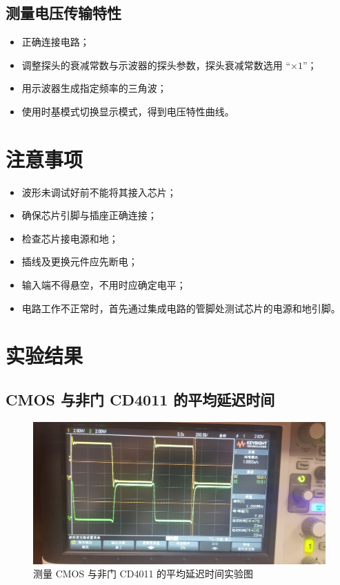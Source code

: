 \documentclass[a4paper]{article}
\begin{document}
    \subsection{测量电压传输特性}

        \begin{itemize}
            \item 正确连接电路；
            \item 调整探头的衰减常数与示波器的探头参数，探头衰减常数选用 “$\times 1$”；
            \item 用示波器生成指定频率的三角波；
            \item 使用时基模式切换显示模式，得到电压特性曲线。
        \end{itemize}

\section{注意事项}

    \begin{itemize}
        \item 波形未调试好前不能将其接入芯片；
        \item 确保芯片引脚与插座正确连接；
        \item 检查芯片接电源和地；
        \item 插线及更换元件应先断电；
        \item 输入端不得悬空，不用时应确定电平；
        \item 电路工作不正常时，首先通过集成电路的管脚处测试芯片的电源和地引脚。
    \end{itemize}

\section{实验结果}

    \subsection{CMOS 与非门 CD4011 的平均延迟时间}

        \begin{figure}[H]
            \centering
            \includegraphics[width=0.7\linewidth]{figures/f4}
            \caption{测量 CMOS 与非门 CD4011 的平均延迟时间实验图}
        \end{figure}
\end{document}

